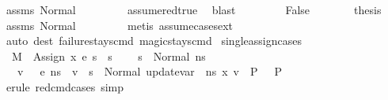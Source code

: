 \begin{isabellebody}
\ assms\ Normal\ \isanewline
\ \ \ \ \ \ \isamarkupfalse%
\ assume{\isacharunderscore}{\kern0pt}red{\isacharunderscore}{\kern0pt}true\ \isamarkupfalse%
\ blast\isanewline
\ \ \isamarkupfalse%
\isanewline
\ \ \ \ \isamarkupfalse%
\ False\isanewline
\ \ \ \ \isamarkupfalse%
\ \isamarkupfalse%
\ {\isacharquery}{\kern0pt}thesis\ \isamarkupfalse%
\ assms\ Normal\ \isanewline
\ \ \ \ \ \ \isamarkupfalse%
\ {\isacharparenleft}{\kern0pt}metis\ assume{\isacharunderscore}{\kern0pt}cases{\isacharunderscore}{\kern0pt}ext{\isacharparenright}{\kern0pt}\isanewline
\ \ \isamarkupfalse%
\isanewline
{}\isamarkupfalse%
\ {\isacharparenleft}{\kern0pt}auto\ dest{\isacharcolon}{\kern0pt}\ failure{\isacharunderscore}{\kern0pt}stays{\isacharunderscore}{\kern0pt}cmd\ magic{\isacharunderscore}{\kern0pt}stays{\isacharunderscore}{\kern0pt}cmd{\isacharparenright}{\kern0pt}%
\endisatagproof
{\isafoldproof}%
%
\isadelimproof
\isanewline
%
\endisadelimproof
\isanewline
{}\isamarkupfalse%
\ single{\isacharunderscore}{\kern0pt}assign{\isacharunderscore}{\kern0pt}cases{\isacharcolon}{\kern0pt}\isanewline
\ \ {\isachardoublequoteopen}{\isasymlbrakk}M{\isacharcomma}{\kern0pt}{\isasymLambda}{\isacharcomma}{\kern0pt}{\isasymGamma}{\isacharcomma}{\kern0pt}{\isasymDelta}\ {\isasymturnstile}\ {\isasymlangle}Assign\ x\ e{\isacharcomma}{\kern0pt}\ s{\isasymrangle}\ {\isasymrightarrow}\ s{\isacharprime}{\kern0pt}{\isacharsemicolon}{\kern0pt}\ \isanewline
\ \ \ s\ {\isacharequal}{\kern0pt}\ Normal\ n{\isacharunderscore}{\kern0pt}s{\isacharsemicolon}{\kern0pt}\isanewline
\ \ \ {\isasymAnd}v{\isachardot}{\kern0pt}\ {\isasymLambda}{\isacharcomma}{\kern0pt}{\isasymGamma}{\isacharcomma}{\kern0pt}{\isasymDelta}\ {\isasymturnstile}\ {\isasymlangle}e{\isacharcomma}{\kern0pt}\ n{\isacharunderscore}{\kern0pt}s{\isasymrangle}\ {\isasymDown}\ v\ {\isasymLongrightarrow}\ s{\isacharprime}{\kern0pt}\ {\isacharequal}{\kern0pt}\ Normal\ {\isacharparenleft}{\kern0pt}update{\isacharunderscore}{\kern0pt}var\ {\isasymLambda}\ n{\isacharunderscore}{\kern0pt}s\ x\ v{\isacharparenright}{\kern0pt}\ {\isasymLongrightarrow}\ P\ {\isasymrbrakk}\ {\isasymLongrightarrow}\ P{\isachardoublequoteclose}\isanewline
%
\isadelimproof
\ \ %
\endisadelimproof
%
\isatagproof
{}\isamarkupfalse%
\ {\isacharparenleft}{\kern0pt}erule\ red{\isacharunderscore}{\kern0pt}cmd{\isachardot}{\kern0pt}cases{\isacharsemicolon}{\kern0pt}\ simp{\isacharparenright}{\kern0pt}%

\end{isabellebody}
